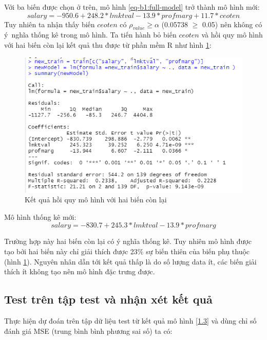 Với ba biến được chọn ở trên, mô hình \ref{eq-b1:full-model} trở thành mô hình mới:
\begin{equation}\label{1.2}
\textit{salary} = -950.6 + 248.2 * \textit{lmktval} - 13.9 *\textit{profmarg} + 11.7  *\textit{ceoten}
\end{equation}
Tuy nhiên ta nhận thấy biến $\textit{ceoten}$ có $\rho_{value} \ge \alpha$ (0.05738 $\ge$ 0.05) nên không có ý~nghĩa thống kê trong mô hình. Ta tiến hành bỏ biến $\textit{ceoten}$ và hồi quy mô hình với hai biến còn lại kết quả thu được từ phần mềm R như hình \ref{fig-b1:new-summary}:

\begin{figure}[H]
	\centering
	\includegraphics[width=.7\linewidth]{../Photo Of Result/B1_newsummary.PNG}  
	\caption{Kết quả hồi quy mô hình với hai biến còn lại}
	\label{fig-b1:new-summary}
\end{figure}

Mô hình thống kê mới:
\begin{equation}\label{1.3}
\textit{salary} = -830.7 + 245.3 *\textit{lmktval} -13.9 *\textit{profmarg}
\end{equation}

Trường hợp này hai biến còn lại có ý nghĩa thống kê. Tuy nhiên mô hình được tạo bởi hai biến này chỉ giải thích được 23$\%$ sự biến thiên của biến phụ thuộc (hình \ref{fig-b1:new-summary}). Nguyên nhân dẫn tới kết quả thấp là do số lượng data ít, các biến giải thích ít không tạo nên mô hình đặc trưng được.

\subsection*{Test trên tập test và nhận xét kết quả}

Thực hiện dự đoán trên tập dữ liệu test từ kết quả mô hình \ref{1.3} và dùng chỉ số đánh giá MSE (trung bình bình phương sai số) ta có:

